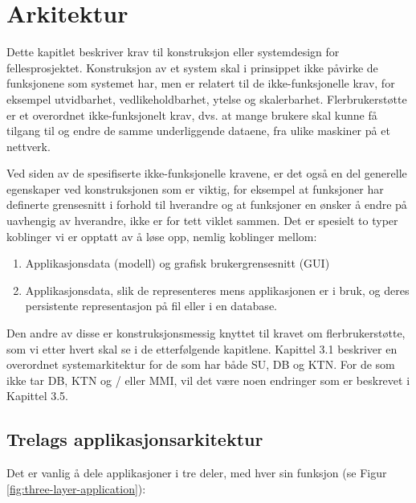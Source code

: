 \section{Arkitektur}
Dette kapitlet beskriver krav til konstruksjon eller systemdesign for fellesprosjektet. Konstruksjon av et system skal i prinsippet ikke påvirke de funksjonene som systemet har, men er relatert til de ikke-funksjonelle krav, for eksempel utvidbarhet, vedlikeholdbarhet, ytelse og skalerbarhet. Flerbrukerstøtte er et overordnet ikke-funksjonelt krav, dvs. at mange brukere skal kunne få tilgang til og endre de samme underliggende dataene, fra ulike maskiner på et nettverk.

Ved siden av de spesifiserte ikke-funksjonelle kravene, er det også en del generelle egenskaper ved konstruksjonen som er viktig, for eksempel at funksjoner har definerte grensesnitt i forhold til hverandre og at funksjoner en ønsker å endre på uavhengig av hverandre, ikke er for tett viklet sammen. Det er spesielt to typer koblinger vi er opptatt av å løse opp, nemlig koblinger mellom:

\begin{enumerate}

\item
Applikasjonsdata (modell) og grafisk brukergrensesnitt (GUI)

\item
Applikasjonsdata, slik de representeres mens applikasjonen er i bruk, og deres persistente representasjon på fil eller i en database. 

\end{enumerate}

Den andre av disse er konstruksjonsmessig knyttet til kravet om flerbrukerstøtte, som vi etter hvert skal se i de etterfølgende kapitlene. Kapittel 3.1 beskriver en overordnet systemarkitektur for de som har både SU, DB og KTN. For de som ikke tar DB, KTN og / eller MMI, vil det være noen endringer som er beskrevet i Kapittel 3.5.

\subsection{Trelags applikasjonsarkitektur}

Det er vanlig å dele applikasjoner i tre deler, med hver sin funksjon (se Figur \ref{fig:three-layer-application}):

